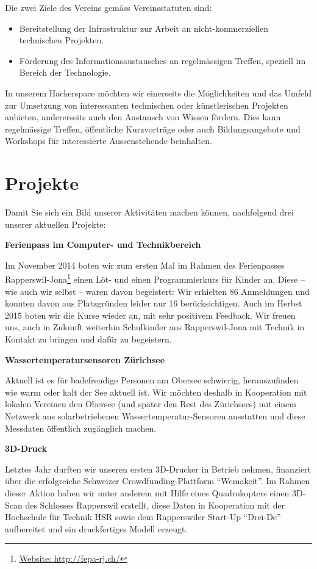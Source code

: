 \documentclass[10pt,a4paper,parskip,fleqn]{scrartcl}
\begin{document}
Die zwei Ziele des Vereins gemäss Vereinsstatuten sind:

\begin{itemize}
		\item Bereitstellung der Infrastruktur zur Arbeit an nicht-kommerziellen
			technischen Projekten.
		\item Förderung des Informationsaustausches an regelmässigen Treffen,
			speziell im Bereich der Technologie.
\end{itemize}

In unserem Hackerspace möchten wir einerseits die Möglichkeiten und das Umfeld
zur Umsetzung von interessanten technischen oder künstlerischen Projekten
anbieten, andererseits auch den Austausch von Wissen fördern. Dies kann
regelmässige Treffen, öffentliche Kurzvorträge oder auch Bildungsangebote und
Workshops für interessierte Aussenstehende beinhalten.

\section{Projekte}

Damit Sie sich ein Bild unserer Aktivitäten machen können, nachfolgend drei
unserer aktuellen Projekte:

\textbf{Ferienpass im Computer- und Technikbereich}

Im November 2014 boten wir zum ersten Mal im Rahmen des Ferienpasses
Rapperswil-Jona\footnote{\url{Website: http://fepa-rj.ch/}} einen Löt- und einen
Programmierkurs für Kinder an. Diese -- wie auch wir selbst -- waren davon
begeistert: Wir erhielten 86 Anmeldungen und konnten davon aus Platzgründen
leider nur 16 berücksichtigen. Auch im Herbst 2015 boten wir die Kurse wieder
an, mit sehr positivem Feedback. Wir freuen uns, auch in Zukunft weiterhin
Schulkinder aus Rapperswil-Jona mit Technik in Kontakt zu bringen und dafür zu
begeistern.

\newpage
\textbf{Wassertemperatursensoren Zürichsee}

Aktuell ist es für badefreudige Personen am Obersee schwierig, herauszufinden
wie warm oder kalt der See aktuell ist. Wir möchten deshalb in Kooperation mit
lokalen Vereinen den Obersee (und später den Rest des Zürichsees) mit einem
Netzwerk aus solarbetriebenen Wassertemperatur-Sensoren ausstatten und diese
Messdaten öffentlich zugänglich machen.

\textbf{3D-Druck}

Letztes Jahr durften wir unseren ersten 3D-Drucker in Betrieb nehmen, finanziert
über die erfolgreiche Schweizer Crowdfunding-Plattform ``Wemakeit''. Im Rahmen
dieser Aktion haben wir unter anderem mit Hilfe eines Quadrokopters einen
3D-Scan des Schlosses Rapperswil erstellt, diese Daten in Kooperation mit der
Hochschule für Technik HSR sowie dem Rapperswiler Start-Up ``Drei-De''
aufbereitet und ein druckfertiges Modell erzeugt.
\end{document}
